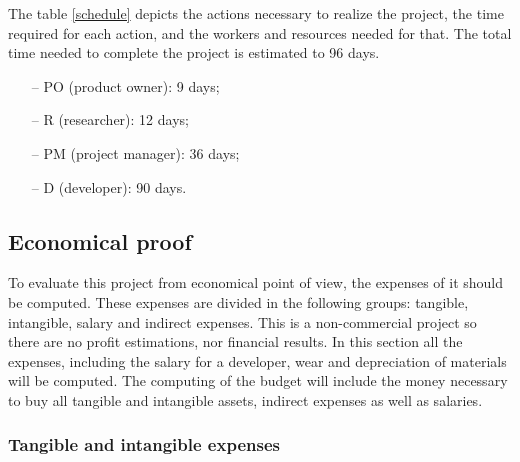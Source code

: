 The table \ref{schedule} depicts the actions necessary to realize the project, the time required for each action, and the workers and resources needed for that. The total time needed to complete the project is estimated to 96 days.
\begin{itemize}[topsep=5pt, partopsep=0pt,itemsep=3pt,parsep=1pt]
\item[--] PO (product owner): 9 days;
\item[--] R (researcher): 12 days;
\item[--] PM (project manager): 36 days;
\item[--] D (developer): 90 days.
\end{itemize}


	\subsection{Economical proof}

	To evaluate this project from economical point of view, the expenses of it should be computed. These expenses are divided in the following groups: tangible, intangible, salary and indirect expenses. This is a non-commercial project so there are no profit estimations, nor financial results. In this section all the expenses, including the salary for a developer, wear and depreciation of materials will be computed. The computing of the budget will include the money necessary to buy all tangible and intangible assets, indirect expenses as well as salaries.


		\subsubsection{Tangible and intangible expenses}

